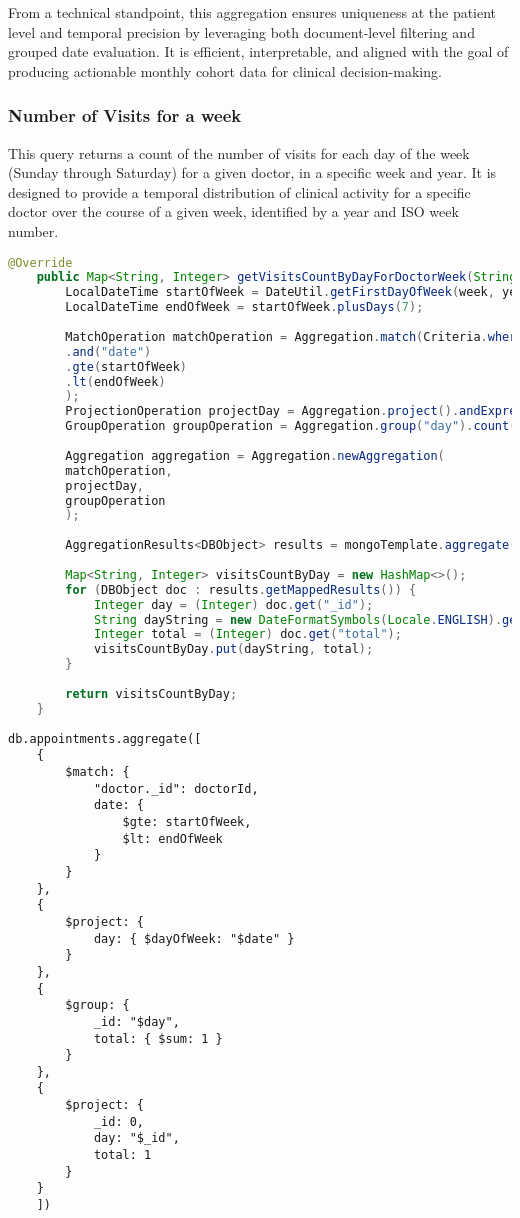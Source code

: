 From a technical standpoint, this aggregation ensures uniqueness at the patient level and temporal precision by leveraging both document-level filtering and grouped date evaluation. It is efficient, interpretable, and aligned with the goal of producing actionable monthly cohort data for clinical decision-making.

\subsubsection{Number of Visits for a week}
This query returns a count of the number of visits for each day of the week (Sunday through Saturday) for a given doctor, in a specific week and year. It is designed to provide a temporal distribution of clinical activity for a specific doctor over the course of a given week, identified by a year and ISO week number. 

\begin{lstlisting}[language=java]
	@Override
	public Map<String, Integer> getVisitsCountByDayForDoctorWeek(String doctorId, Integer week, Integer year) {
		LocalDateTime startOfWeek = DateUtil.getFirstDayOfWeek(week, year).atStartOfDay();
		LocalDateTime endOfWeek = startOfWeek.plusDays(7);
		
		MatchOperation matchOperation = Aggregation.match(Criteria.where("doctor.id").is(doctorId)
		.and("date")
		.gte(startOfWeek)
		.lt(endOfWeek)
		);
		ProjectionOperation projectDay = Aggregation.project().andExpression("dayOfWeek(date)").as("day");
		GroupOperation groupOperation = Aggregation.group("day").count().as("total");
		
		Aggregation aggregation = Aggregation.newAggregation(
		matchOperation,
		projectDay,
		groupOperation
		);
		
		AggregationResults<DBObject> results = mongoTemplate.aggregate(aggregation, Appointment.class, DBObject.class);
		
		Map<String, Integer> visitsCountByDay = new HashMap<>();
		for (DBObject doc : results.getMappedResults()) {
			Integer day = (Integer) doc.get("_id");
			String dayString = new DateFormatSymbols(Locale.ENGLISH).getWeekdays()[day].toLowerCase();
			Integer total = (Integer) doc.get("total");
			visitsCountByDay.put(dayString, total);
		}
		
		return visitsCountByDay;
	}
\end{lstlisting}

\begin{lstlisting}[language=mongodb]
	db.appointments.aggregate([
	{
		$match: {
			"doctor._id": doctorId,
			date: {
				$gte: startOfWeek,
				$lt: endOfWeek
			}
		}
	},
	{
		$project: {
			day: { $dayOfWeek: "$date" }
		}
	},
	{
		$group: {
			_id: "$day",
			total: { $sum: 1 }
		}
	},
	{
		$project: {
			_id: 0,
			day: "$_id",
			total: 1
		}
	}
	])
\end{lstlisting}

